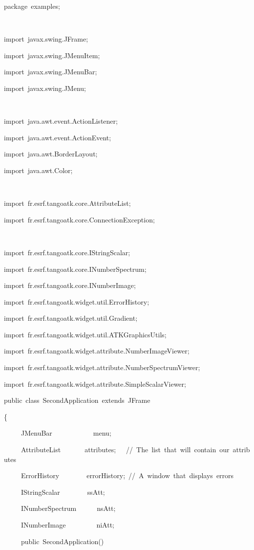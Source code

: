 
\begin{lyxcode}
package~examples;

~

import~javax.swing.JFrame;

import~javax.swing.JMenuItem;

import~javax.swing.JMenuBar;

import~javax.swing.JMenu;

~

import~java.awt.event.ActionListener;

import~java.awt.event.ActionEvent;

import~java.awt.BorderLayout;

import~java.awt.Color;

~

import~fr.esrf.tangoatk.core.AttributeList;

import~fr.esrf.tangoatk.core.ConnectionException;

~

import~fr.esrf.tangoatk.core.IStringScalar;

import~fr.esrf.tangoatk.core.INumberSpectrum;

import~fr.esrf.tangoatk.core.INumberImage;

import~fr.esrf.tangoatk.widget.util.ErrorHistory;

import~fr.esrf.tangoatk.widget.util.Gradient;

import~fr.esrf.tangoatk.widget.util.ATKGraphicsUtils;

import~fr.esrf.tangoatk.widget.attribute.NumberImageViewer;

import~fr.esrf.tangoatk.widget.attribute.NumberSpectrumViewer;

import~fr.esrf.tangoatk.widget.attribute.SimpleScalarViewer;

public~class~SecondApplication~extends~JFrame

\{

~~~~~JMenuBar~~~~~~~~~~~~menu;

~~~~~AttributeList~~~~~~~attributes;~~~//~The~list~that~will~contain~our~attributes

~~~~~ErrorHistory~~~~~~~~errorHistory;~//~A~window~that~displays~errors

~~~~~IStringScalar~~~~~~~~ssAtt;

~~~~~INumberSpectrum~~~~~~nsAtt;

~~~~~INumberImage~~~~~~~~~niAtt;

~~~~~public~SecondApplication()


\end{lyxcode}
